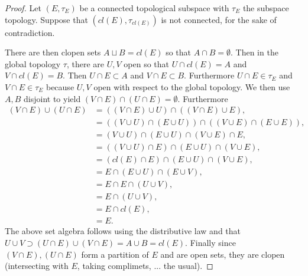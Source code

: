 \documentclass[11pt]{amsart}
\theoremstyle{definition}
\numberwithin{theorem}{section}
\numberwithin{definition}{section}
\numberwithin{equation}{section}
\begin{document}
\begin{proof}
Let $(E, \tau_E)$ be a connected topological subspace with $\tau_E$ the subspace topology. Suppose that $(cl(E), \tau_{cl(E)})$ is not connected, for the sake of contradiction. 

There are then clopen sets $A \sqcup B = cl(E)$ so that $A \cap B = \emptyset$. Then in the global topology $\tau$, there are $U, V$ open so that $U \cap cl(E) = A$ and $V \cap cl(E) = B$. Then
$U \cap E \subset A$ and $V \cap E \subset B$. Furthermore $U \cap E \in \tau_E$ and $V \cap E \in \tau_E$ because $U,V$ open with respect to the global topology. We then use $A,B$ disjoint to yield $(V \cap E)  \cap (U \cap E) = \emptyset.$ Furthermore
\begin{equation*}
\begin{aligned}
	(V \cap E)  \cup (U \cap E) &= ((V \cap E) \cup U) \cap  ((V \cap E) \cup E) ,\\
	&= ((V \cup U) \cap (E \cup U)) \cap ((V \cup E) \cap (E \cup E)) ,\\
	&= (V \cup U) \cap (E \cup U) \cap (V \cup E) \cap E ,\\
	&= ((V \cup U)\cap E ) \cap (E \cup U) \cap (V \cup E) ,\\
	&= (cl(E) \cap E ) \cap (E \cup U) \cap (V \cup E) ,\\
	&=  E \cap (E \cup U) \cap (E \cup V) ,\\
	&=  E \cap E \cap (U \cup  V) ,\\
	&=  E  \cap (U \cup  V) ,\\
	&=  E  \cap cl(E) ,\\
	&=  E. 
\end{aligned}
\end{equation*}
The above set algebra follows using the distributive law and that $U \cup V \supset (U \cap E) \cup (V \cap E) = A \cup B = cl(E).$  Finally since $(V \cap E), (U \cap E)$ form a partition of $E$ and are open sets, they are clopen (intersecting with $E$, taking complimets, ... the usual).
\end{proof}
\end{document}
